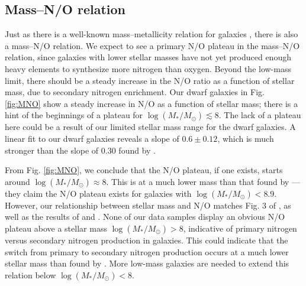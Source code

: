 

\subsection{Mass--N/O relation}\label{sec:Mass_NO}

Just as there is a well-known mass--metallicity relation for galaxies 
\citep[where the metallicity increases with stellar mass; see, 
e.g.,][]{Tremonti04}, there is also a mass--N/O relation.  We expect to see a 
primary N/O plateau in the mass--N/O relation, since galaxies with lower stellar 
masses have not yet produced enough heavy elements to synthesize more nitrogen 
than oxygen.  Beyond the low-mass limit, there should be a steady increase in 
the N/O ratio as a function of stellar mass, due to secondary nitrogen 
enrichment.  Our dwarf galaxies in Fig. \ref{fig:MNO} show a steady increase in 
N/O as a function of stellar mass; there is a hint of the beginnings of a 
plateau for $\log(M_*/M_{\odot}) \lesssim 8$.  The lack of a plateau here could 
be a result of our limited stellar mass range for the dwarf galaxies.  A linear 
fit to our dwarf galaxies reveals a slope of $0.6\pm 0.12$, which is much 
stronger than the slope of $0.30$ found by \cite{Andrews13}.

From Fig. \ref{fig:MNO}, we conclude that the N/O plateau, if one exists, starts 
around $\log(M_*/M_{\odot}) \approx 8$.  This is at a much lower mass than that 
found by \cite{Andrews13} --- they claim the N/O plateau exists for galaxies 
with $\log(M_*/M_{\odot}) < 8.9$.  However, our relationship between stellar 
mass and N/O matches Fig. 3 of \cite{Amorin10}, as well as the results of 
\cite{PerezMontero09} and \cite{PerezMontero13}.  None of our data samples 
display an obvious N/O plateau above a stellar mass 
$\log(M_*/M_{\odot}) > 8$, indicative of primary nitrogen versus secondary 
nitrogen production in galaxies.  This could indicate that the switch from 
primary to secondary nitrogen production occurs at a much lower stellar mass 
than found by \cite{Andrews13}.  More low-mass galaxies are needed to extend 
this relation below $\log(M_*/M_{\odot}) < 8$.

